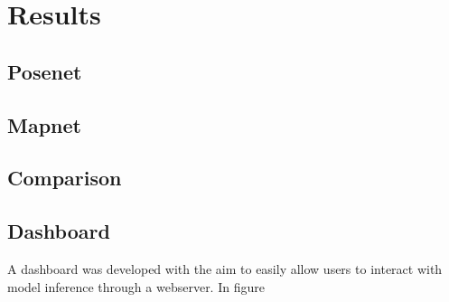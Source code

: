 \section{Results}
\subsection{Posenet}
\subsection{Mapnet}
\subsection{Comparison}
\subsection{Dashboard}
A dashboard was developed with the aim to easily allow users to interact with model inference through a webserver. In figure 



